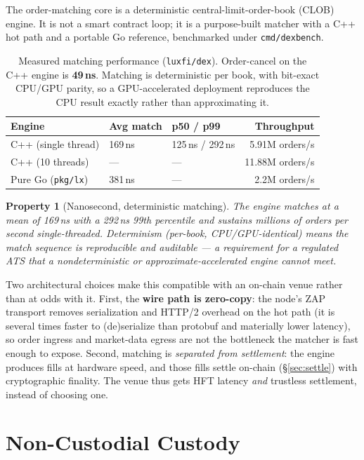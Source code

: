 \documentclass[11pt,a4paper]{article}
\newtheorem{property}{Property}[section]
\begin{document}
The order-matching core is a deterministic central-limit-order-book (CLOB)
engine. It is not a smart contract loop; it is a purpose-built matcher with a
C++ hot path and a portable Go reference, benchmarked under
\texttt{cmd/dexbench}.

\begin{table}[h]
\centering
\small
\begin{tabular}{@{}lllr@{}}
\toprule
\textbf{Engine} & \textbf{Avg match} & \textbf{p50 / p99} & \textbf{Throughput}\\
\midrule
C++ (single thread) & 169\,ns & 125\,ns / 292\,ns & 5.91M orders/s\\
C++ (10 threads)    & ---     & ---               & 11.88M orders/s\\
Pure Go (\texttt{pkg/lx}) & 381\,ns & --- & 2.2M orders/s\\
\bottomrule
\end{tabular}
\caption{Measured matching performance (\texttt{luxfi/dex}). Order-cancel on
the C++ engine is \textbf{49\,ns}. Matching is deterministic per book, with
bit-exact CPU/GPU parity, so a GPU-accelerated deployment reproduces the CPU
result exactly rather than approximating it.}
\label{tab:hft}
\end{table}

\begin{property}[Nanosecond, deterministic matching]
The engine matches at a mean of 169\,ns with a 292\,ns 99th percentile and
sustains millions of orders per second single-threaded. Determinism (per-book,
CPU/GPU-identical) means the match sequence is reproducible and auditable ---
a requirement for a regulated ATS that a nondeterministic or
approximate-accelerated engine cannot meet.
\end{property}

Two architectural choices make this compatible with an on-chain venue rather
than at odds with it. First, the \textbf{wire path is zero-copy}: the node's
ZAP transport removes serialization and HTTP/2 overhead on the hot path (it is
several times faster to (de)serialize than protobuf and materially lower
latency), so order ingress and market-data egress are not the bottleneck the
matcher is fast enough to expose. Second, matching is \emph{separated from
settlement}: the engine produces fills at hardware speed, and those fills
settle on-chain (\S\ref{sec:settle}) with cryptographic finality. The venue
thus gets HFT latency \emph{and} trustless settlement, instead of choosing
one.

\section{Non-Custodial Custody}
\label{sec:custody}
\end{document}
